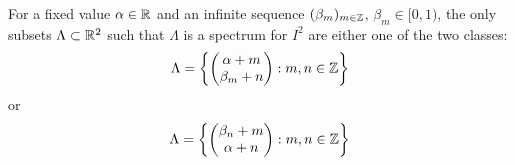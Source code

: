 \documentclass[../thesis.tex]{subfiles}
\begin{document}
\begin{theorem}\label{thrm:class_all_shift_2d}
    For a fixed value $\alpha \in \mathbb{R}$ and an infinite sequence $(\beta_m)_{m\in \mathbb{Z}}$, $\beta_m \in [0,1)$, the only subsets $\Lambda \subset \mathbb{R}^2$ such that $\Lambda$ is a spectrum for $I^2$ are either one of the two classes:
    \begin{equation}\label{eq:2d_all_shift_class_1}
        \Lambda = \left\{
            \begin{pmatrix}
            \alpha + m\\
            \beta_m + n
            \end{pmatrix} : m,n \in  \mathbb{Z}
            \right\}
    \end{equation}
    or
    \begin{equation}\label{eq:2d_all_shift_class_2}
        \Lambda = \left\{
            \begin{pmatrix}
            \beta_n + m\\
            \alpha + n
            \end{pmatrix} : m,n \in  \mathbb{Z}
            \right\}
    \end{equation}
\end{theorem}
\end{document}
